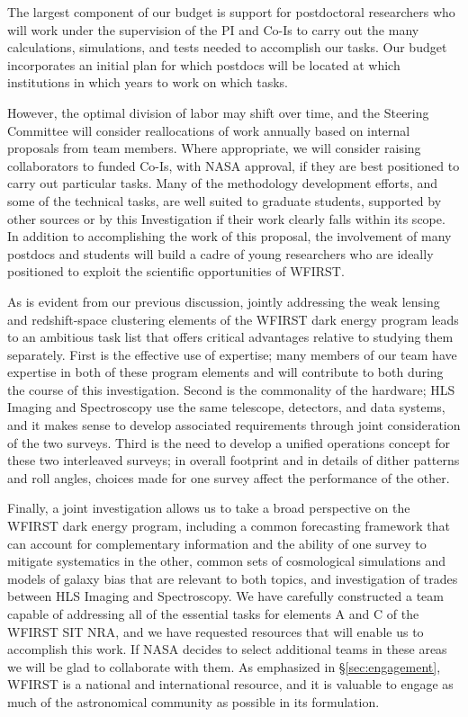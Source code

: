   The largest component of our budget is support for postdoctoral researchers
who will work under the supervision of the PI and Co-Is to carry out the
many calculations, simulations, and tests needed to accomplish our
tasks.  Our budget incorporates an initial plan for which postdocs will
be located at which institutions in which years to work on which tasks.

However, the optimal division of labor may shift over time, and the
Steering Committee will consider reallocations of work annually
based on internal proposals from team members.  Where appropriate,
we will consider raising collaborators to funded Co-Is, with NASA approval,
if they are best positioned to carry out particular tasks.
Many of the methodology development efforts, and some of the
technical tasks, are well suited to graduate students, supported
by other sources or by this Investigation if their work
clearly falls within its scope.  In addition to accomplishing the
work of this proposal, the involvement of many postdocs and students
will build a cadre of young researchers who are ideally positioned
to exploit the scientific opportunities of WFIRST.

 As is evident from our previous discussion, jointly addressing the
weak lensing and redshift-space clustering elements of the WFIRST
dark energy program leads to an ambitious task list that offers critical
advantages relative to studying them separately.  First is the effective use of expertise; many members of
our team have expertise in both of these program elements and will
contribute to both during the course of this investigation. Second is
the commonality of the hardware; HLS Imaging and Spectroscopy use the
same telescope, detectors, and data systems, and it makes sense to develop associated requirements
through joint consideration of the two surveys.
Third is the need to develop a unified operations concept for these
two interleaved surveys; in overall footprint and in details of
dither patterns and roll angles, choices made for one survey affect
the performance of the other.

Finally, a joint investigation allows us to take a broad perspective
on the WFIRST dark energy program, including a common forecasting
framework that can account for complementary information and the
ability of one survey to mitigate systematics in the other,
common sets of cosmological simulations and models of galaxy bias
that are relevant to both topics, and investigation of trades
between HLS Imaging and Spectroscopy.  We have carefully
constructed a team capable of addressing all of the essential tasks for elements A and C of the WFIRST SIT NRA, and
we have requested resources that will enable us to accomplish this work.
If NASA decides to select additional teams in these areas we will be glad to collaborate with them. 
As emphasized in \S\ref{sec:engagement}, WFIRST is a national and international resource, and
it is valuable to engage as much of the astronomical community
as possible in its formulation.  

